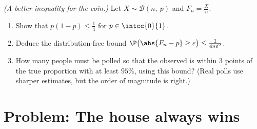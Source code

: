 \begin{exercise}[$\star\star\star$]\label{exo:g12:sums:8}
\emph{(A better inequality for the coin.)} Let
$X \sim \mathcal B(n,\ p)$ and $F_n = \frac Xn$.
\begin{enumerate}
  \item Show that $p(1-p) \leq \frac14$ for $p \in \intcc{0}{1}$.
  \item Deduce the distribution-free bound
        $\P\bigl(\abs{F_n - p} \geq \varepsilon\bigr) \leq
        \frac{1}{4n\varepsilon^2}$.
  \item How many people must be polled so that the observed  is
        within $3$ points of the true proportion with  at least
        $95\%$, using this bound? (Real polls use sharper estimates, but
        the order of magnitude is right.)
\end{enumerate}
\end{exercise}

\section{Problem: The house always wins}

